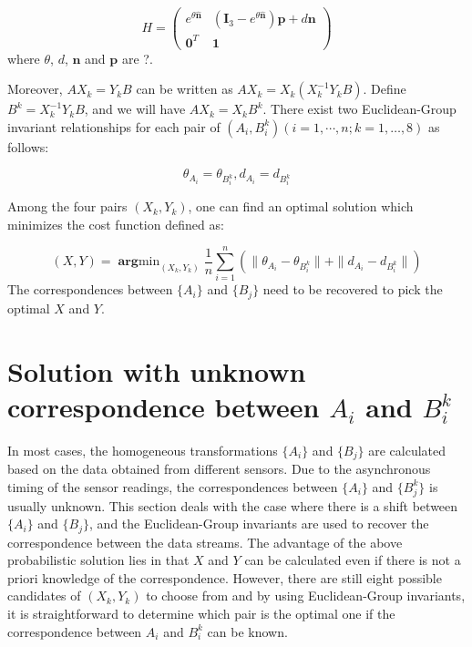 \documentclass[letterpaper, 10 pt, conference]{ieeeconf}  %
\begin{document}
\begin{equation}\label{equ21}
H = \left( \begin{array}{cc}
       e^{\theta \hat{\mathbf{n}}} & (\mathbf{I}_{3} - e^{\theta \hat{\mathbf{n}}})\mathbf{p} + d\mathbf{n} \\
       \mathbf{0}^{T} & \mathbf{1}
\end{array} \right)
\end{equation}
where $\theta$, $d$, $\mathbf{n}$ and $\mathbf{p}$ are ?.

Moreover, $AX_k = Y_k B$ can be written as $AX_k=X_k(X_k^{-1}Y_kB)$. Define $B^k = X_k^{-1}Y_kB$, and we will have $AX_k=X_kB^k$. There exist two Euclidean-Group invariant relationships for each pair of $(A_{i},B_{i}^k)( i = 1,\cdots,n; k=1,\dots,8)$ as follows:

\begin{equation}\label{equ22}
    \theta_{A_{i}}=\theta_{B_{i}^{k}}, d_{A_{i}}=d_{B_{i}^{k}}
\end{equation}

Among the four pairs $(X_{k},Y_{k})$, one can find an optimal solution which  minimizes the cost function defined as:

\begin{equation}\label{equ23}
    (X,Y) = \mathop{\mathbf{arg}min}_{(X_{k},Y_{k})}\frac{1}{n} \sum_{i=1}^{n} (\parallel \theta_{A_{i}}-\theta_{B_{i}^{k}} \parallel + \parallel d_{A_{i}}-d_{B_{i}^{k}} \parallel)
\end{equation}
The correspondences between $\{A_i\}$ and $\{B_j\}$ need to be recovered to pick the optimal $X$ and $Y$.
\section{Solution with unknown correspondence between $A_{i}$ and $B_{i}^{k}$}
\label{sect3}

In most cases, the homogeneous transformations  $\{A_i\}$ and $\{B_j\}$ are calculated based on the data obtained from different sensors. Due to the asynchronous timing of the sensor readings, the correspondences between $\{A_{i}\}$ and $\{B_{j}^{k}\}$ is usually unknown. This section deals with the case where there is a shift between $\{A_i\}$ and $\{B_j\}$, and the Euclidean-Group invariants are used to recover the correspondence between the data streams. The advantage of the above probabilistic solution lies in that $X$ and $Y$ can be calculated even if there is not a priori knowledge of the correspondence. However, there are still eight possible candidates of $(X_{k},Y_{k})$ to choose from and by using Euclidean-Group invariants, it is straightforward to determine which pair is the optimal one if the correspondence between $A_{i}$ and $B_{i}^{k}$ can be known.
\end{document}
